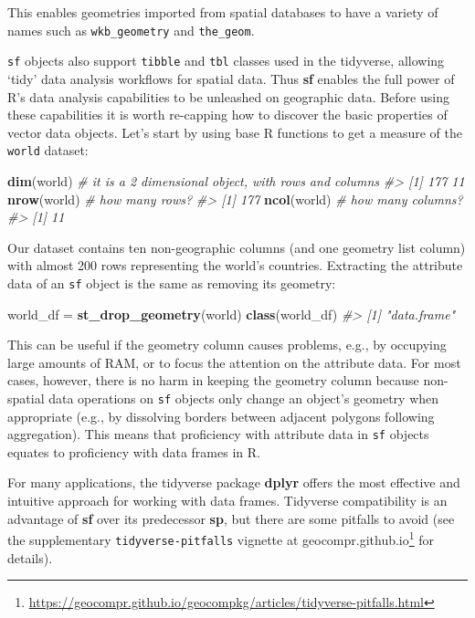 \documentclass[]{krantz}
\newenvironment{Shaded}{\begin{snugshade}}{\end{snugshade}}
\newcommand{\CommentTok}[1]{\textcolor[rgb]{0.37,0.37,0.37}{\textit{#1}}}
\newcommand{\KeywordTok}[1]{\textcolor[rgb]{0.27,0.27,0.27}{\textbf{#1}}}
\newcommand{\NormalTok}[1]{#1}
\newcommand{\StringTok}[1]{\textcolor[rgb]{0.5,0.5,0.5}{#1}}
\let\rmarkdownfootnote\footnote%
\def\footnote{\protect\rmarkdownfootnote}
\renewcommand{\href}[2]{#2\footnote{\url{#1}}}
\begin{document}
This enables geometries imported from spatial databases to have a variety of names such as \texttt{wkb\_geometry} and \texttt{the\_geom}.

\texttt{sf} objects also support \texttt{tibble} and \texttt{tbl} classes used in the tidyverse, allowing `tidy' data analysis workflows for spatial data.
Thus \textbf{sf} enables the full power of R's data analysis capabilities to be unleashed on geographic data.
Before using these capabilities it is worth re-capping how to discover the basic properties of vector data objects.
Let's start by using base R functions to get a measure of the \texttt{world} dataset:

\begin{Shaded}
\begin{Highlighting}[]
\KeywordTok{dim}\NormalTok{(world) }\CommentTok{# it is a 2 dimensional object, with rows and columns}
\CommentTok{#> [1] 177  11}
\KeywordTok{nrow}\NormalTok{(world) }\CommentTok{# how many rows?}
\CommentTok{#> [1] 177}
\KeywordTok{ncol}\NormalTok{(world) }\CommentTok{# how many columns?}
\CommentTok{#> [1] 11}
\end{Highlighting}
\end{Shaded}

Our dataset contains ten non-geographic columns (and one geometry list column) with almost 200 rows representing the world's countries.
Extracting the attribute data of an \texttt{sf} object is the same as removing its geometry:

\begin{Shaded}
\begin{Highlighting}[]
\NormalTok{world_df =}\StringTok{ }\KeywordTok{st_drop_geometry}\NormalTok{(world)}
\KeywordTok{class}\NormalTok{(world_df)}
\CommentTok{#> [1] "data.frame"}
\end{Highlighting}
\end{Shaded}

This can be useful if the geometry column causes problems, e.g., by occupying large amounts of RAM, or to focus the attention on the attribute data.
For most cases, however, there is no harm in keeping the geometry column because non-spatial data operations on \texttt{sf} objects only change an object's geometry when appropriate (e.g., by dissolving borders between adjacent polygons following aggregation).
This means that proficiency with attribute data in \texttt{sf} objects equates to proficiency with data frames in R.

For many applications, the tidyverse package \textbf{dplyr} offers the most effective and intuitive approach for working with data frames.
Tidyverse compatibility is an advantage of \textbf{sf} over its predecessor \textbf{sp}, but there are some pitfalls to avoid (see the supplementary \texttt{tidyverse-pitfalls} vignette at \href{https://geocompr.github.io/geocompkg/articles/tidyverse-pitfalls.html}{geocompr.github.io} for details).
\end{document}
